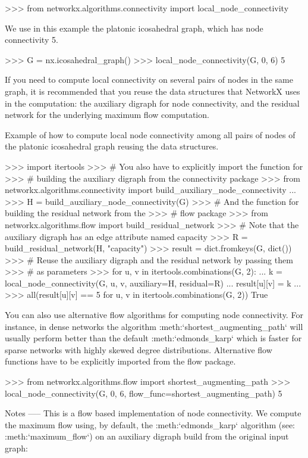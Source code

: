 \begin{DoxyVerb}
>>> from networkx.algorithms.connectivity import local_node_connectivity

We use in this example the platonic icosahedral graph, which has node
connectivity 5.

>>> G = nx.icosahedral_graph()
>>> local_node_connectivity(G, 0, 6)
5

If you need to compute local connectivity on several pairs of
nodes in the same graph, it is recommended that you reuse the
data structures that NetworkX uses in the computation: the
auxiliary digraph for node connectivity, and the residual
network for the underlying maximum flow computation.

Example of how to compute local node connectivity among
all pairs of nodes of the platonic icosahedral graph reusing
the data structures.

>>> import itertools
>>> # You also have to explicitly import the function for
>>> # building the auxiliary digraph from the connectivity package
>>> from networkx.algorithms.connectivity import build_auxiliary_node_connectivity
...
>>> H = build_auxiliary_node_connectivity(G)
>>> # And the function for building the residual network from the
>>> # flow package
>>> from networkx.algorithms.flow import build_residual_network
>>> # Note that the auxiliary digraph has an edge attribute named capacity
>>> R = build_residual_network(H, "capacity")
>>> result = dict.fromkeys(G, dict())
>>> # Reuse the auxiliary digraph and the residual network by passing them
>>> # as parameters
>>> for u, v in itertools.combinations(G, 2):
...     k = local_node_connectivity(G, u, v, auxiliary=H, residual=R)
...     result[u][v] = k
...
>>> all(result[u][v] == 5 for u, v in itertools.combinations(G, 2))
True

You can also use alternative flow algorithms for computing node
connectivity. For instance, in dense networks the algorithm
:meth:`shortest_augmenting_path` will usually perform better than
the default :meth:`edmonds_karp` which is faster for sparse
networks with highly skewed degree distributions. Alternative flow
functions have to be explicitly imported from the flow package.

>>> from networkx.algorithms.flow import shortest_augmenting_path
>>> local_node_connectivity(G, 0, 6, flow_func=shortest_augmenting_path)
5

Notes
-----
This is a flow based implementation of node connectivity. We compute the
maximum flow using, by default, the :meth:`edmonds_karp` algorithm (see:
:meth:`maximum_flow`) on an auxiliary digraph build from the original
input graph:


\end{DoxyVerb}
